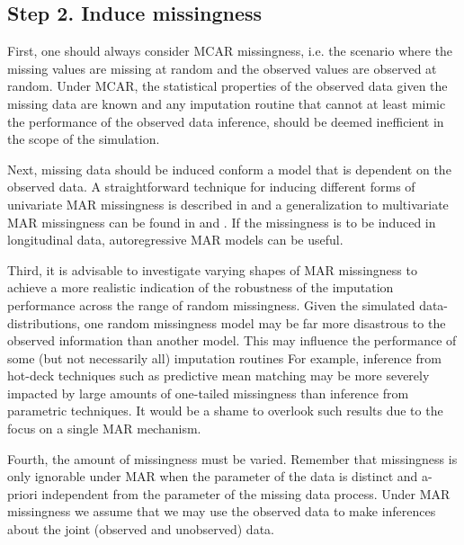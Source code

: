 \documentclass[bimj,fleqn]{w-art}
\theoremstyle{plain}
\theoremstyle{definition}
\begin{document}

\subsection{Step 2. Induce missingness}


First, one should always consider MCAR missingness, i.e. the scenario where the missing values are missing at random and the observed values are observed at random. Under MCAR, the statistical properties of the observed data given the missing data are known and any imputation routine that cannot at least mimic the performance of the observed data inference, should be deemed inefficient in the scope of the simulation.  

Next, missing data should be induced conform a model that is dependent on the observed data. A straightforward technique for inducing different forms of univariate MAR missingness is described in \citet[][p. 63]{fimd} and a generalization to multivariate MAR missingness can be found in \citet[][Appendix B]{buur06} and \citet[][\S 5.2.3]{brand1999development}. If the missingness is to be induced in longitudinal data, autoregressive MAR models \citep[e.g. cf.][model 2 and model 3]{shara2015randomly} can be useful. 

Third, it is advisable to investigate varying shapes of MAR missingness to achieve a more realistic indication of the robustness of the imputation performance across the range of random missingness. Given the simulated data-distributions, one random missingness model may be far more disastrous to the observed information than another model. This may influence the performance of some (but not necessarily all) imputation routines For example, inference from  hot-deck techniques such as predictive mean matching \citep{little1988missing, rubin1986statistical} may be more severely impacted by large amounts of one-tailed missingness than inference from parametric techniques. It would be a shame to overlook such results due to the focus on a single MAR mechanism. 

Fourth, the amount of missingness must be varied. Remember that missingness is only ignorable under MAR when the parameter of the data is distinct and a-priori independent from the parameter of the missing data process. Under MAR missingness we assume that we may use the observed data to make inferences about the joint (observed and unobserved) data. 
\end{document}
